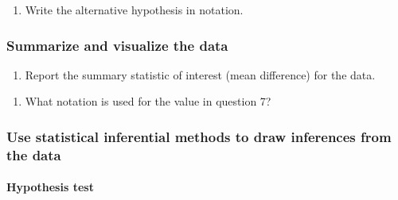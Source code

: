 \documentclass[
]{report}
\providecommand{\tightlist}{%
  \setlength{\itemsep}{0pt}\setlength{\parskip}{0pt}}
\begin{document}
\vspace{0.8in}

\begin{enumerate}
\def\labelenumi{\arabic{enumi}.}
\setcounter{enumi}{5}
\tightlist
\item
  Write the alternative hypothesis in notation.
\end{enumerate}

\vspace{0.3in}

\hypertarget{summarize-and-visualize-the-data-2}{%
\subsubsection*{Summarize and visualize the data}\label{summarize-and-visualize-the-data-2}}

\begin{enumerate}
\def\labelenumi{\arabic{enumi}.}
\setcounter{enumi}{6}
\tightlist
\item
  Report the summary statistic of interest (mean difference) for the data.
\end{enumerate}

\vspace{0.3in}

\begin{enumerate}
\def\labelenumi{\arabic{enumi}.}
\setcounter{enumi}{7}
\tightlist
\item
  What notation is used for the value in question 7?
\end{enumerate}

\vspace{0.3in}

\hypertarget{use-statistical-inferential-methods-to-draw-inferences-from-the-data}{%
\subsubsection*{Use statistical inferential methods to draw inferences from the data}\label{use-statistical-inferential-methods-to-draw-inferences-from-the-data}}

\hypertarget{hypothesis-test}{%
\paragraph*{Hypothesis test}\label{hypothesis-test}}
\end{document}
